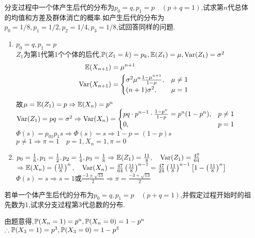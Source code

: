 \begin{problem}{3.21}
分支过程中一个体产生后代的分布为$p_0=q,p_1=p \quad (p+q=1)$,试求第$n$代总体的均值和方差及群体消亡的概率.如产生后代的分布为$p_0=1/8,p_1=1/2,p_2=1/4,p_3=1/8$,试回答同样的问题.
\end{problem}
\begin{solution}
	\begin{enumerate}[label=(\roman*)]
		\item $p_0=q, p_1=p$\\
		      $Z_1$为第1代第1个个体的后代,$\mathbb{P}(Z_1=k)=p_k, \mathbb{E}(Z_1)=\mu, \mathrm{Var}(Z_1)=\sigma ^2$
		      \[\begin{split}
				      \mathbb{E}(X_{n+1}) &= \mu ^{n+1}\\
				      \mathrm{Var}(X_{n+1}) &= \begin{cases}
					      \sigma ^2 \mu ^n \frac{1-\mu ^{n+1}}{1-\mu}, & \mu \neq 1 \\
					      (n+1)\sigma ^2,                              & \mu = 1
				      \end{cases}
			      \end{split}\]
		      故$\mu = \mathbb{E}(Z_1) = p \Rightarrow \mathbb{E}(X_n)=p^n$\\
		      $\mathrm{Var}(Z_1)=pq=\sigma ^2\Rightarrow \mathrm{Var}(X_n)=\begin{cases}
				      pq\cdot p^{n-1}\cdot \frac{1-p^n}{1-p}=p^n(1-p^n), & p\neq 1 \\
				      0,                                                 & p=1
			      \end{cases}$
		      $\Phi(s)= p_{01}p_1 s\Rightarrow \Phi(s)=s\Rightarrow 1-p=(1-p)s$\\
		      $p\neq 1\Rightarrow \pi=1 \quad p=1,X_n=1,\pi=0$
		\item $p_0=\frac{1}{8},p_1=\frac{1}{2},p_2=\frac{1}{4},p_3=\frac{1}{8}\Rightarrow \mathbb{E}(Z_1)=\frac{11}{8},\quad \mathrm{Var}(Z_1)=\frac{47}{64}$\\
		      $\Rightarrow \mathbb{E}(X_n)=\left(\frac{11}{8}\right)^n,\quad \mathrm{Var}(X_n)=\frac{47}{64}\left(\frac{11}{8}\right)^{n-1} = \frac{47}{24}\left(\frac{11}{8}\right)^{n-1}\left[1-\left(\frac{11}{8}\right)^n\right]$\\
		      $\Phi(s)=s\Rightarrow s=1\text{或}\frac{-3\pm\sqrt{13}}{2}\Rightarrow \pi = \frac{-3+\sqrt{13}}{2}$
	\end{enumerate}
\end{solution}

\begin{problem}{3.22}
若单一个体产生后代的分布为$p_0=q, p_1=p\quad (p+q=1)$,并假定过程开始时的祖先数为1,试求分支过程第3代总数的分布.
\end{problem}
\begin{solution}
	由题意得,$\mathbb{P}(X_n=1)=p^n,\mathbb{P}(X_n=0)=1-p^n$\\
	$\therefore \mathbb{P}(X_3=1)=p^3,\mathbb{P}(X_3=0)=1-p^3$
\end{solution}

